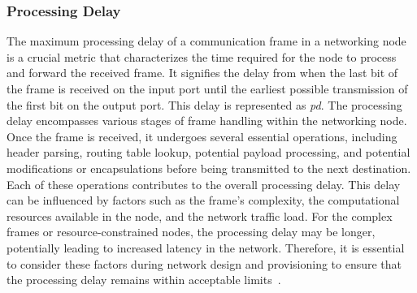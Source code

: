 

    \subsubsection{Processing Delay}


    The maximum processing delay of a communication frame in a networking node is a crucial metric that characterizes the time required for the node to process and forward the received frame. It signifies the delay from when the last bit of the frame is received on the input port until the earliest possible transmission of the first bit on the output port. This delay is represented as \textit{pd}.
    The processing delay encompasses various stages of frame handling within the networking node. Once the frame is received, it undergoes several essential operations, including header parsing, routing table lookup, potential payload processing, and potential modifications or encapsulations before being transmitted to the next destination. Each of these operations contributes to the overall processing delay. This delay can be influenced by factors such as the frame's complexity, the computational resources available in the node, and the network traffic load. For the complex frames or resource-constrained nodes, the processing delay may be longer, potentially leading to increased latency in the network. Therefore, it is essential to consider these factors during network design and provisioning to ensure that the processing delay remains within acceptable limits~\cite{askaripoor2023designer}.

